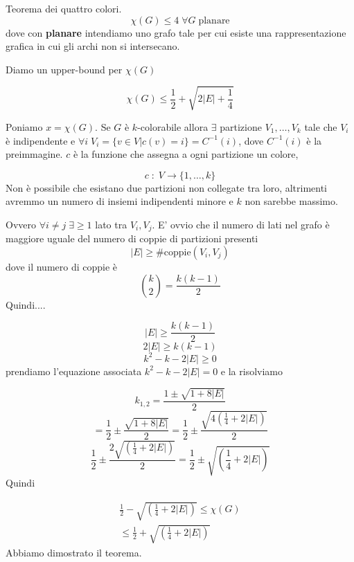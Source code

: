 \documentclass[12pt]{report}
\begin{document}
\begin{teo}
    Teorema dei quattro colori.
    $$\chi(G) \leq 4 \; \forall G \; \text{planare}$$
    dove con \textbf{planare} intendiamo uno grafo tale per cui esiste una rappresentazione grafica in cui gli archi non si intersecano.
\end{teo}

\begin{fatto} Diamo un upper-bound per $\chi(G)$

$$\chi(G) \leq \frac{1}{2}  + \sqrt{2 |E| + \frac{1}{4}}$$

\end{fatto}

\begin{dimo}
    Poniamo $x = \chi(G)$.
    Se $G$ è $k$-colorabile allora $\exists$ partizione $V_1,\dots,V_k$ tale che $V_i$ è indipendente e $\forall i \; V_i= \{v \in V | c(v) = i\} = C^{-1}(i)$, dove $C^{-1}(i)$ è la preimmagine. $c$ è la funzione che assegna a ogni partizione un colore,

    $$c\;:\; V \rightarrow \{1,\dots,k\}$$
    Non è possibile che esistano due partizioni non collegate tra loro, altrimenti avremmo un numero di insiemi indipendenti minore e $k$ non sarebbe massimo.


    \noindent 
    Ovvero $\forall i \neq j \; \exists \geq 1$ lato tra $V_i,V_j$. E' ovvio che il numero di lati nel grafo è maggiore uguale del numero di coppie di partizioni presenti
    $$|E| \geq \text{\#coppie}(V_i,V_j)$$
    dove il numero di coppie è $$\binom{k}{2} = \frac{k(k-1)}{2}$$
    Quindi....

    $$|E| \geq \frac{k(k-1)}{2}$$
    $$2|E| \geq k(k-1)$$
    $$k^2 -k -2|E| \geq 0$$
    prendiamo l'equazione associata $k^2 -k -2|E| = 0$ e la risolviamo

    $$k_{1,2} = \frac{1 \pm \sqrt{1 + 8|E|}}{2}$$
    $$= \frac{1}{2} \pm \frac{\sqrt{1 + 8|E|}}{2} = \frac{1}{2} \pm \frac{\sqrt{4(\frac{1}{4} + 2|E|)}}{2} $$
    $$\frac{1}{2} \pm \frac{2\sqrt{(\frac{1}{4} + 2|E|)}}{2} =  \frac{1}{2} \pm \sqrt{(\frac{1}{4} + 2|E|)}$$
    Quindi 

    \begin{multline*}
            \frac{1}{2} - \sqrt{(\frac{1}{4} + 2|E|)} \leq \chi(G) \\ \leq \frac{1}{2} + \sqrt{(\frac{1}{4} + 2|E|)}
    \end{multline*}
    Abbiamo dimostrato il teorema.
\end{dimo}
\end{document}
